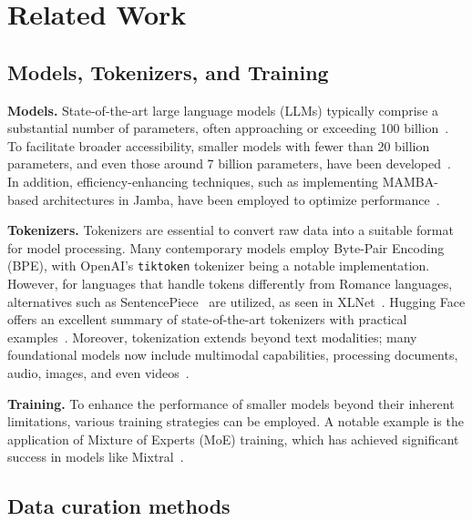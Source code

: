 \section{Related Work}\label{sec2.related_work}
\subsection{Models, Tokenizers, and Training}\label{sec2.1}

\textbf{Models.} State-of-the-art large language models (LLMs) typically comprise a substantial number of parameters, often approaching or exceeding 100 billion~\cite{dubey2024llama, achiam2023gpt, team2023gemini}. To facilitate broader accessibility, smaller models with fewer than 20 billion parameters, and even those around 7 billion parameters, have been developed~\cite{bai2023qwen,yang2024qwen2,dubey2024llama,jiang2023mistral7b,lieber2024jamba,team2024jamba}. In addition, efficiency-enhancing techniques, such as implementing MAMBA-based architectures in Jamba, have been employed to optimize performance~\cite{lieber2024jamba,team2024jamba}.



\textbf{Tokenizers.} Tokenizers are essential to convert raw data into a suitable format for model processing. Many contemporary models employ Byte-Pair Encoding (BPE)\cite{sennrich2015neural}, with OpenAI's \texttt{tiktoken} tokenizer\cite{tiktoken} being a notable implementation. However, for languages that handle tokens differently from Romance languages, alternatives such as SentencePiece~\cite{kudo2018sentencepiece} are utilized, as seen in XLNet~\cite{yang2019xlnet}. Hugging Face offers an excellent summary of state-of-the-art tokenizers with practical examples~\cite{huggingface_tokens}. Moreover, tokenization extends beyond text modalities; many foundational models now include multimodal capabilities, processing documents, audio, images, and even videos~\cite{reid2024gemini,maaz2023video,zhang2023video,zhang2024mm}.



\textbf{Training.} To enhance the performance of smaller models beyond their inherent limitations, various training strategies can be employed. A notable example is the application of Mixture of Experts (MoE) training, which has achieved significant success in models like Mixtral~\cite{jiang2024mixtral}.



\subsection{Data curation methods}\label{sec2.2}

